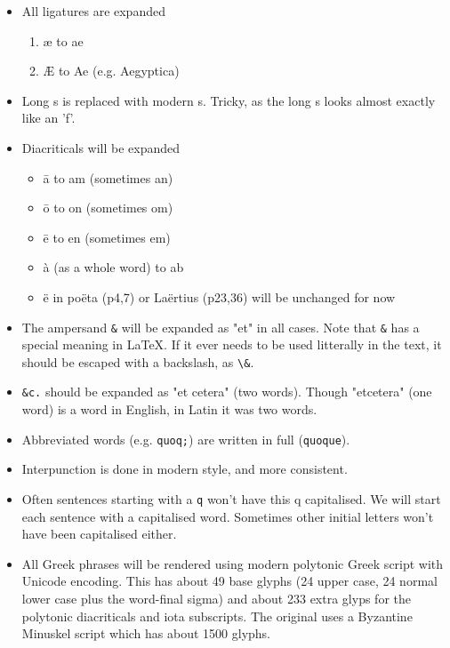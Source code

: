 \documentclass{report}
\begin{document}
\begin{itemize}
\item All ligatures are expanded
	\begin{enumerate}
	\item æ to ae
	\item Æ to Ae (e.g. Aegyptica)
	\end{enumerate}
\item Long s is replaced with modern s. Tricky, as the long s looks almost
exactly like an 'f'.
\item Diacriticals will be expanded
	\begin{itemize}
	\item ā to am (sometimes an)
	\item ō to on (sometimes om)
	\item ē to en (sometimes em)
	\item à (as a whole word) to ab
	\item ë in poëta (p4,7) or Laërtius (p23,36) will be unchanged for now
	\end{itemize}
\item The ampersand \verb+&+ will be expanded as "et" in all cases.
 Note that \verb+&+ has a special meaning in \LaTeX. If it ever needs to be
 used litterally in the text, it should be escaped with a backslash, as
 \verb+\&+.
\item \verb+&c.+ should be expanded as "et cetera" (two words). Though
 "etcetera" (one word) is a word in English, in Latin it was two words.
\item Abbreviated words (e.g. \verb+quoq;+) are written in full (\verb+quoque+).
\item Interpunction is done in modern style, and more consistent.
\item Often sentences starting with a \verb+q+ won't have this q capitalised.
We will start each sentence with a capitalised word. Sometimes other initial
letters won't have been capitalised either.
\item All Greek phrases will be rendered using modern polytonic Greek
script with Unicode encoding.
This has about 49 base glyphs (24 upper case, 24 normal lower case
plus the word-final sigma) and about 233 extra glyps for
the polytonic diacriticals and iota subscripts.
The original uses a Byzantine Minuskel script which has about 1500 glyphs.
\end{itemize}

\end{document}
